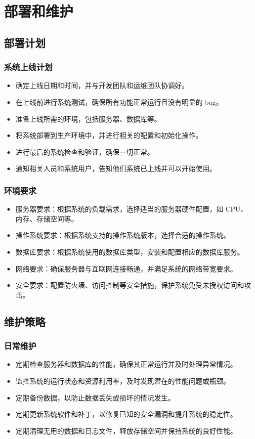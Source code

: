 \documentclass{article}
\begin{document}
\section{部署和维护}
\subsection{部署计划}
\subsubsection{系统上线计划}
\begin{itemize}
	\item 确定上线日期和时间，并与开发团队和运维团队协调好。
	\item 在上线前进行系统测试，确保所有功能正常运行且没有明显的 bug。
	\item 准备上线所需的环境，包括服务器、数据库等。
	\item 将系统部署到生产环境中，并进行相关的配置和初始化操作。
	\item 进行最后的系统检查和验证，确保一切正常。
	\item 通知相关人员和系统用户，告知他们系统已上线并可以开始使用。
\end{itemize}

\subsubsection{环境要求}
\begin{itemize}
	\item 服务器要求：根据系统的负载需求，选择适当的服务器硬件配置，如 CPU、内存、存储空间等。
	\item 操作系统要求：根据系统支持的操作系统版本，选择合适的操作系统。
	\item 数据库要求：根据系统使用的数据库类型，安装和配置相应的数据库服务。
	\item 网络要求：确保服务器与互联网连接畅通，并满足系统的网络带宽要求。
	\item 安全要求：配置防火墙、访问控制等安全措施，保护系统免受未授权访问和攻击。
\end{itemize}

\subsection{维护策略}
\subsubsection{日常维护}
\begin{itemize}
	\item 定期检查服务器和数据库的性能，确保其正常运行并及时处理异常情况。
	\item 监控系统的运行状态和资源利用率，及时发现潜在的性能问题或瓶颈。
	\item 定期备份数据，以防止数据丢失或损坏的情况发生。
	\item 定期更新系统软件和补丁，以修复已知的安全漏洞和提升系统的稳定性。
	\item 定期清理无用的数据和日志文件，释放存储空间并保持系统的良好性能。
\end{itemize}
\end{document}
